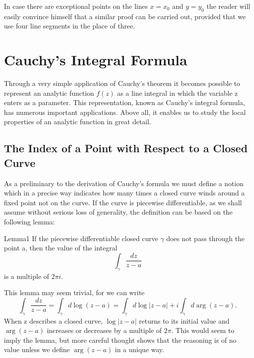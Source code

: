 In case there are exceptional points on the lines $x = x_{0}$ and $y = y_{0}$ the reader will easily convince himself that a similar proof can be carried out, provided that we use four line segments in the place of three.

\setcounter{section}{1}\section{Cauchy's Integral Formula}\label{sec:4.2}
Through a very simple application of Cauchy's theorem it becomes possible to represent an analytic function $f(z)$ as a line integral in which the variable z enters as a parameter. This representation, known as Cauchy's integral formula, has numerous important applications. Above all, it enables us to study the local properties of an analytic function in great detail.

\setcounter{section}{2}\setcounter{subsection}{0}\subsection{The Index of a Point with Respect to a Closed Curve}\label{sec:4.2.1}
As a preliminary to the derivation of Cauchy's formula we must define a notion which in a precise way indicates how many times a closed curve winds around a fixed point not on the curve. If the curve is piecewise differentiable, as we shall assume without serious loss of generality, the definition can be based on the following lemma:


\begin{originalstatement}{Lemma}{1}\label{lem:4.1}
If the piecewise differentiable closed curve $\gamma$ does not pass through the point a, then the value of the integral
\begin{equation*}
\int_ {\gamma} \frac {d z}{z - a}
\end{equation*}
is a multiple of $2\pi i$.

\end{originalstatement}
This lemma may seem trivial, for we can write
\begin{equation*}
\int_ {\gamma} \frac {d z}{z - a} = \int_ {\gamma} d \log (z - a) = \int_ {\gamma} d \log | z - a | + i \int_ {\gamma} d \arg (z - a).
\end{equation*}
When z describes a closed curve, $\log |z - a|$ returns to its initial value and $\arg (z - a)$ increases or decreases by a multiple of $2\pi$. This would seem to imply the lemma, but more careful thought shows that the reasoning is of no value unless we define $\arg (z - a)$ in a unique way.

